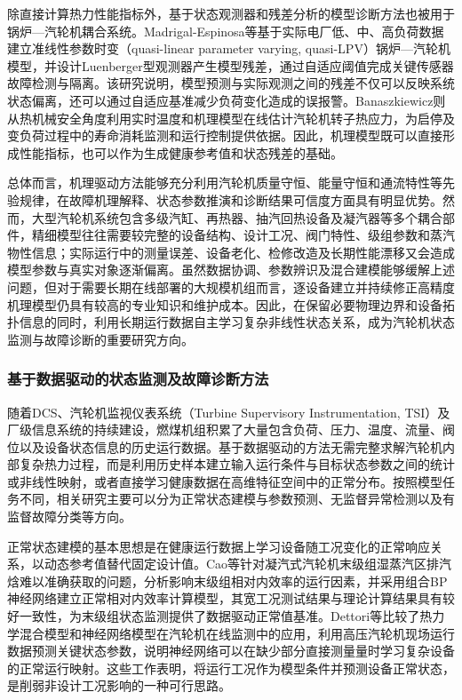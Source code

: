 除直接计算热力性能指标外，基于状态观测器和残差分析的模型诊断方法也被用于锅炉—汽轮机耦合系统。Madrigal-Espinosa等基于实际电厂低、中、高负荷数据建立准线性参数时变（quasi-linear parameter varying, quasi-LPV）锅炉—汽轮机模型，并设计Luenberger型观测器产生模型残差，通过自适应阈值完成关键传感器故障检测与隔离\cite{Madrigal2017BoilerTurbineFDI}。该研究说明，模型预测与实际观测之间的残差不仅可以反映系统状态偏离，还可以通过自适应基准减少负荷变化造成的误报警。Banaszkiewicz则从热机械安全角度利用实时温度和机理模型在线估计汽轮机转子热应力，为启停及变负荷过程中的寿命消耗监测和运行控制提供依据\cite{Banaszkiewicz2016ThermalStress}。因此，机理模型既可以直接形成性能指标，也可以作为生成健康参考值和状态残差的基础。

总体而言，机理驱动方法能够充分利用汽轮机质量守恒、能量守恒和通流特性等先验规律，在故障机理解释、状态参数推演和诊断结果可信度方面具有明显优势。然而，大型汽轮机系统包含多级汽缸、再热器、抽汽回热设备及凝汽器等多个耦合部件，精细模型往往需要较完整的设备结构、设计工况、阀门特性、级组参数和蒸汽物性信息；实际运行中的测量误差、设备老化、检修改造及长期性能漂移又会造成模型参数与真实对象逐渐偏离。虽然数据协调、参数辨识及混合建模能够缓解上述问题\cite{Jiang2014DataReconciliation,Yu2020HybridDigitalTwin}，但对于需要长期在线部署的大规模机组而言，逐设备建立并持续修正高精度机理模型仍具有较高的专业知识和维护成本。因此，在保留必要物理边界和设备拓扑信息的同时，利用长期运行数据自主学习复杂非线性状态关系，成为汽轮机状态监测与故障诊断的重要研究方向。

\subsubsection{基于数据驱动的状态监测及故障诊断方法}

随着DCS、汽轮机监视仪表系统（Turbine Supervisory Instrumentation, TSI）及厂级信息系统的持续建设，燃煤机组积累了大量包含负荷、压力、温度、流量、阀位以及设备状态信息的历史运行数据。基于数据驱动的方法无需完整求解汽轮机内部复杂热力过程，而是利用历史样本建立输入运行条件与目标状态参数之间的统计或非线性映射，或者直接学习健康数据在高维特征空间中的正常分布。按照模型任务不同，相关研究主要可以分为正常状态建模与参数预测、无监督异常检测以及有监督故障分类等方向。

正常状态建模的基本思想是在健康运行数据上学习设备随工况变化的正常响应关系，以动态参考值替代固定设计值。Cao等针对凝汽式汽轮机末级组湿蒸汽区排汽焓难以准确获取的问题，分析影响末级组相对内效率的运行因素，并采用组合BP神经网络建立正常相对内效率计算模型，其宽工况测试结果与理论计算结果具有较好一致性，为末级组状态监测提供了数据驱动正常值基准\cite{Cao2016LastStageNormalValue}。Dettori等比较了热力学混合模型和神经网络模型在汽轮机在线监测中的应用，利用高压汽轮机现场运行数据预测关键状态参数，说明神经网络可以在缺少部分直接测量量时学习复杂设备的正常运行映射\cite{Dettori2017MonitoringModels}。这些工作表明，将运行工况作为模型条件并预测设备正常状态，是削弱非设计工况影响的一种可行思路。

